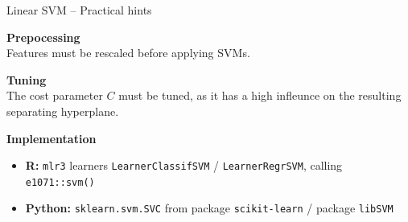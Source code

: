 \documentclass[11pt,compress,t,notes=noshow, xcolor=table]{beamer}
\newcommand{\highlight}[1]{\textcolor{highlightcol}{\textbf{#1}}}
\let\code=\texttt
\begin{document}
\begin{frame}{Linear SVM -- Practical hints}

\footnotesize

  \highlight{Prepocessing} \\
  Features must be rescaled before applying SVMs.
  
  \medskip
  
  \highlight{Tuning} \\
  The cost parameter $C$ must be tuned, as it has a high infleunce on the resulting separating hyperplane. 

  \medskip

  \highlight{Implementation} 
  \begin{itemize}
    \item \textbf{R:} \code{mlr3} learners \code{LearnerClassifSVM} / 
    \code{LearnerRegrSVM}, calling \code{e1071::svm()}
    \item \textbf{Python:} \code{sklearn.svm.SVC} from package \code{scikit-learn} / package \code{libSVM}
  \end{itemize}

\end{frame}






\end{document}

